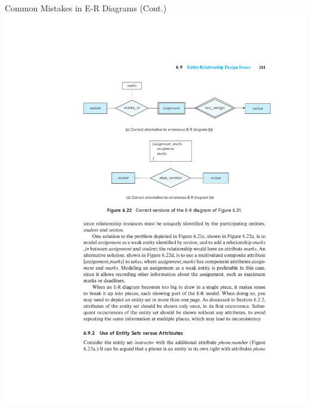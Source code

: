 \documentclass{beamer}
\begin{document}
\begin{frame}{Common Mistakes in E-R Diagrams (Cont.)}
    \centering
    \includegraphics[trim={5.5cm 14cm 2.4cm 4.5cm}, clip, width=\textwidth]{figures/incorrect_use2}
\end{frame}
\end{document}
